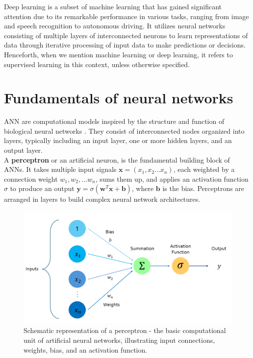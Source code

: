 Deep learning is a subset of machine learning that has gained significant attention due to its remarkable performance in various tasks, ranging from image and speech recognition to autonomous driving. It utilizes neural networks consisting of multiple layers of interconnected neurons to learn representations of data through iterative processing of input data to make predictions or decisions. Henceforth, when we mention machine learning or deep learning, it refers to supervised learning in this context, unless otherwise specified.
\section{Fundamentals of neural networks}
\gls{ANN} are computational models inspired by the structure and function of biological neural networks \cite{rumel}. They consist of interconnected nodes organized into layers, typically including an input layer, one or more hidden layers, and an output layer. \\ 
A \textbf{perceptron} or an artificial neuron, is the fundamental building block of ANNs. It takes multiple input signals $\mathbf{x}= \left(x_1, x_2 ...x_n\right)$, each weighted by a connection weight $w_1,w_2,...w_n$, sums them up, and applies an activation function $\sigma$ to produce an output $\mathbf{y} = \sigma \left(\mathbf{w}^T\mathbf{x} + \mathbf{b} \right)$, where $\mathbf{b}$ is the bias. Perceptrons are arranged in layers to build complex neural network architectures.\\
\begin{figure}[ht]
    \centering
    \includegraphics[width=12cm]{images/Theory-DL/ActFn.png}
    \caption{Schematic representation of a perceptron - the basic computational unit of artificial neural networks, illustrating input connections, weights, bias, and an activation function.}
    \label{fig:Perceptron}
  \end{figure}
